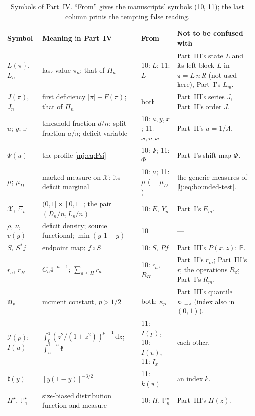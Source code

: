 \documentclass[11pt,a4paper]{article}
\theoremstyle{definition}\newaliascnt{definition}{theorem}
\theoremstyle{remark}\newaliascnt{remark}{theorem}
\newcommand{\dd}{\mathrm d}
\newcommand{\ljP}{\mathbb P}
\begin{document}
\begin{table}[htbp]
\centering\small
\caption{Symbols of Part~IV. ``From'' gives the manuscripts' symbols
(10, 11); the last column prints the tempting false reading.}
\label{mj:tab:notation}
\begin{tabular}{>{\raggedright}p{.16\linewidth}>{\raggedright}p{.29\linewidth}>{\raggedright}p{.14\linewidth}>{\raggedright\arraybackslash}p{.29\linewidth}}
\toprule
Symbol & Meaning in Part~IV & From & Not to be confused with\\
\midrule
$L(\pi)$, $L_n$ & last value $\pi_n$; that of $\Pi_n$ & 10: $L$; 11: $L$
 & Part~III's state $L$ and its left block $L$ in $\pi=L\,n\,R$ (not used
 here), Part~I's $L_m$.\\
$J(\pi)$, $J_n$ & first deficiency $|\pi|-F(\pi)$; that of $\Pi_n$ & both
 & Part~III's series $J$, Part~II's order $J$.\\
$u$; $y$; $x$ & threshold fraction $d/n$; split fraction $a/n$; deficit
 variable & 10: $u,y,x$; 11: $x,u,x$ & Part~II's $u=1/\Lambda$.\\
$\Psi(u)$ & the profile \eqref{mj:eq:Psi} & 10: $\Psi$; 11: $\Phi$ &
 Part~I's shift map $\Phi$.\\
$\mu$; $\mu_D$ & marked measure on $\mathcal X$; its deficit marginal & 10:
 $\mu$; 11: $\mu$ ($=\mu_D$) & the generic measures of
 \eqref{lj:eq:bounded-test}.\\
$\mathcal X$, $\Xi_n$ & $(0,1]\times[0,1]$; the pair $(D_n/n,L_n/n)$ & 10:
 $E$, $Y_n$ & Part~I's $E_m$.\\
$\rho$, $\nu$, $v(y)$ & deficit density; source functional; $\min(y,1-y)$ &
 10 & ---\\
$S$, $S^\ast f$ & endpoint map; $f\circ S$ & 10: $S$, $Pf$ & Part~III's
 $P(x,z)$; $\ljP$.\\
$r_a$, $\bar r_H$ & $C_a4^{-a-1}$; $\sum_{a\le H}r_a$ & 10: $r_a$, $R_H$ &
 Part~II's $r_m$; Part~III's $r$; the operations $R_\beta$; Part~I's
 $R_m$.\\
$\mathfrak m_p$ & moment constant, $p>1/2$ & both: $\kappa_p$ & Part~III's
 quantile $\kappa_{1-\epsilon}$ (index also in $(0,1)$).\\
$\mathcal I(p)$; $I(u)$ & $\int_0^1(z^2/(1+z^2))^{p-1}\,\dd z$;
 $\int_u^{1-u}\mathfrak k$ & 11: $I(p)$; 10: $I(u)$, 11: $I_x$ & each
 other.\\
$\mathfrak k(y)$ & $[y(1-y)]^{-3/2}$ & 11: $k(u)$ & an index $k$.\\
$H^\star$, $\ljP^\star_n$ & size-biased distribution function and measure &
 10: $H$, $\mathbb P^\star_n$ & Part~III's $H(z)$.\\

\end{tabular}
\end{table}
\end{document}
